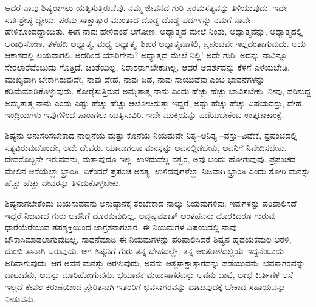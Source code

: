 ಆದರೆ ನಾವು ಶಿಷ್ಯರಾಗಲು ಯತ್ನಿಸುತ್ತಿರುವೆವು. ನಮ್ಮ ಜೀವನದ ಗುರಿ ಪರಮಸತ್ಯವನ್ನು ತಿಳಿಯುವುದು. ಇದೇ ಸರ್ವಶ್ರೇಷ್ಠ ಧ್ಯೇಯ. ಪರಮ ಸಾಕ್ಷಾತ್ಕಾರ ಮುಂತಾದ ದೊಡ್ಡ ದೊಡ್ಡ ಪದಗಳನ್ನು ನಮಗೆ ನಾವೇ ಹೇಳಿಕೊಂಡದ್ದಾಯಿತು. ಈಗ ನಾವು ಹೇಳಿದಂತೆ ಆಗೋಣ. ಅಧ್ಯಾತ್ಮದ ಮೇಲೆ ನಿಂತು, ಅಧ್ಯಾತ್ಮವನ್ನು, ಅಧ್ಯಾತ್ಮದಲ್ಲಿ ಆರಾಧಿಸೋಣ. ತಳಹದಿ ಅಧ್ಯಾತ್ಮ, ಮಧ್ಯ ಅಧ್ಯಾತ್ಮ, ಶಿಖರ ಅಧ್ಯಾತ್ಮವಾಗಲಿ, ಪ್ರಪಂಚವೇ ಇಲ್ಲದಂತಾಗುವುದು. ಅದು ಆಕಾಶದಲ್ಲಿ ಲಯವಾಗಲಿ. ಅದರಿಂದ ಯಾರಿಗೇನು? ಅಧ್ಯಾತ್ಮದ ಮೇಲೆ ನಿಲ್ಲಿ! ಅದೇ ಗುರಿ; ಅದನ್ನು ನಾವಿನ್ನೂ ಸೇರಲಾರೆವೆಂಬುದು ಗೊತ್ತಿದೆ. ಚಿಂತೆಯಿಲ್ಲ, ನಿರಾಶರಾಗಬೇಕಾಗಿಲ್ಲ. ಆದರೆ ಆದರ್ಶವನ್ನು ಕೆಳಗೆ ಎಳೆಯಬೇಡಿ. ಮುಖ್ಯವಾಗಿ ಬೇಕಾಗಿರುವುದೇ, ನಾವು ದೇಹ, ನಾವು ಜಡ, ನಾವು ಸಾಯುವೆವು ಎಂಬ ಭಾವನೆಗಳನ್ನು ಕಡಿಮೆಮಾಡಿಕೊಳ್ಳುವುದು. ಕೋರೈಸುತ್ತಿರುವ ಅಮೃತಾತ್ಮ ನಾನು ಎಂದು ಹೆಚ್ಚು ಹೆಚ್ಚು ಭಾವಿಸಬೇಕು. ನೀವು, ಪರಿಶುದ್ದ ಅಮೃತಾತ್ಮ ನಾನು ಎಂದು ಎಷ್ಟು ಹೆಚ್ಚು ಹೆಚ್ಚು ಆಲೋಚಿಸುತ್ತಾ ಇದ್ದರೆ, ಅಷ್ಟು ಹೆಚ್ಚು ಹೆಚ್ಚು ವಿಷಯವಸ್ತು, ದೇಹ, ಇಂದ್ರಿಯಗಳು ಇವುಗಳಿಂದ ಪಾರಾಗಲು ಯತ್ನಿಸುವಿರಿ. ಇದೇ ಮುಕ್ತಿಯನ್ನು ಪಡೆಯಬೇಕೆಂಬ ಉತ್ಕಟಾಕಾಂಕ್ಷೆ.

ಶಿಷ್ಯನು ಅನುಸರಿಸಬೇಕಾದ ನಾಲ್ಕನೆಯ ಮತ್ತು ಕೊನೆಯ ನಿಯಮವೇ ನಿತ್ಯ–ಅನಿತ್ಯ –ವಸ್ತು–ವಿವೇಕ, ಪ್ರಪಂಚದಲ್ಲಿ ಸತ್ಯವಿರುವುದೊಂದೇ, ಅದೇ ದೇವರು. ಯಾವಾಗಲೂ ಮನಸ್ಸನ್ನು ಅವನಲ್ಲಿಡಬೇಕು, ಅವನಿಗೆ ನಿವೇದಿಸಬೇಕು. ದೇವರೊಬ್ಬನೇ ಇರುವವನು, ಮತ್ತಾವುದೂ ಇಲ್ಲ. ಉಳಿದುವೆಲ್ಲ ನಶ್ವರ, ಅವು ಬಂದು ಹೋಗುವುವು. ಪ್ರಪಂಚದ ಮೇಲಿನ ಆಸೆಯೆಲ್ಲಾ ಭ್ರಾಂತಿ, ಏಕೆಂದರೆ ಪ್ರಪಂಚ ಅಸತ್ಯ. ಉಳಿದವುಗಳೆಲ್ಲಾ ನಿಜವಾಗಿ ಭ್ರಾಂತಿ ಎಂದು ತೋರಿ ಮನಸ್ಸು ಹೆಚ್ಚು ಹೆಚ್ಚು ದೇವರನ್ನು ತಿಳಿದುಕೊಳ್ಳಬೇಕು.

ಶಿಷ್ಯನಾಗಬೇಕೆಂದು ಬಯಸುವವನು ಅನುಷ್ಠಾನಕ್ಕೆ ತರಬೇಕಾದ ನಾಲ್ಕು ನಿಯಮಗಳಿವು. ಇವುಗಳನ್ನು ಪರಿಪಾಲಿಸದೆ ಇದ್ದರೆ ನಿಜವಾದ ಗುರು ಅವನಿಗೆ ದೊರಕುವುದಿಲ್ಲ. ಅದೃಷ್ಟವಶಾತ್ ಅಂತಹವನು ದೊರಕಿದರೂ ಗುರುವು ಧಾರೆಯೆರೆಯುವ ತಪಶ್ಶಕ್ತಿಯಿಂದ ಜಾಗ್ರತನಾಗಲಾರ. ಈ ನಿಯಮಗಳ ವಿಷಯದಲ್ಲಿ ನಾವು ಚೌಕಾಸಿಮಾಡಲಾಗುವುದಿಲ್ಲ. ಸಾಧನೆಮಾಡಿ ಈ ನಿಯಮಗಳನ್ನು ಪರಿಪಾಲಿಸಿದರೆ ಶಿಷ್ಯನ ಹೃದಯಕಮಲ ಅರಳಿ, ದುಂಬಿ ತಾನಾಗಿ ಬರುವುದು. ಆಗ ಶಿಷ್ಯನಿಗೆ ಗುರು ತನ್ನ ದೇಹದಲ್ಲೇ, ತನ್ನ ಅಂತರಾಳದಲ್ಲಿಯೆ ಇದ್ದನೆಂಬುದು ಅರಿವಾಗುವುದು. ಆಗ ಅವನ ಮನಸ್ಸು ಅರಳುವುದು, ಅವನು ಆತ್ಮಸಾಕ್ಷಾತ್ಕಾರವನ್ನು ಪಡೆಯುವನು, ಭವಸಾಗರವನ್ನು ದಾಟುವನು, ಅದನ್ನು ಮಾರಿಹೋಗುವನು. ಭಯಾನಕ ಮಹಾಸಾಗರವನ್ನು ಅವನು ದಾಟಿ, ಲಾಭ ಕೀರ್ತಿಗಳ ಆಸೆ ಇಲ್ಲದೆ ಕೇವಲ ಕರುಣೆಯಿಂದ ಪ್ರೇರಿತನಾಗಿ ಇತರರಿಗೆ ಭವಸಾಗರವನ್ನು ದಾಟುವುದಕ್ಕೆ ಬೇಕಾದ ಸಹಾಯವನ್ನು ನೀಡುವನು.

